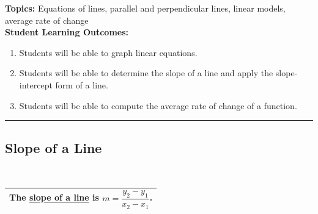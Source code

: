 
\noindent \textbf{Topics:}  Equations of lines, parallel and perpendicular lines, linear models, average rate of change\\

\noindent \textbf{Student Learning Outcomes:}
\begin{enumerate}
\item Students will be able to graph linear equations.
\item Students will be able to determine the slope of a line and apply the slope-intercept form of a line.
\item Students will be able to compute the average rate of change of a function.
\end{enumerate}

\hrule 

\bigskip

\subsection{Slope of a Line} ~

\noindent 
\begin{tabular}{| l |} \hline
The \underline{slope of a line} is $m = \dfrac{y_2-y_1}{x_2-x_1}$.  \\ \hline
 \end{tabular} 
 



